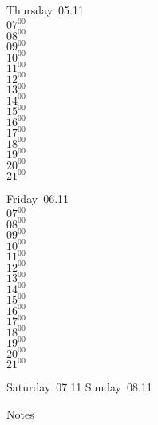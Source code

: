 \documentclass[11pt,a4paper]{book}\usepackage[]{graphicx}\usepackage[]{color}
\begin{document}
\clearpage
\begin{headerbox}
\end{headerbox}
\begin{weekdaybox}
  Thursday~05.11\\
  { 
  \vfill
  $07^{00}$\\
$08^{00}$\\
$09^{00}$\\
$10^{00}$\\
$11^{00}$\\
$12^{00}$\\
$13^{00}$\\
$14^{00}$\\
$15^{00}$\\
$16^{00}$\\
$17^{00}$\\
$18^{00}$\\
$19^{00}$\\
$20^{00}$\\
$21^{00}$\\
  }
\end{weekdaybox} 
\begin{weekdaybox}
  Friday~06.11\\
  { 
  \vfill
  $07^{00}$\\
$08^{00}$\\
$09^{00}$\\
$10^{00}$\\
$11^{00}$\\
$12^{00}$\\
$13^{00}$\\
$14^{00}$\\
$15^{00}$\\
$16^{00}$\\
$17^{00}$\\
$18^{00}$\\
$19^{00}$\\
$20^{00}$\\
$21^{00}$\\
  }
\end{weekdaybox}
\begin{weekendbox}
  Saturday~07.11
  \tcblower
  Sunday~08.11
\end{weekendbox} %
\begin{notebox}
  Notes
\end{notebox}
\clearpage
\end{document}

